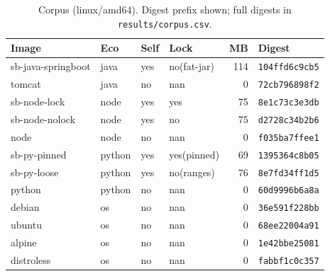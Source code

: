 \begin{table}[t]\centering\caption{Corpus (linux/amd64). Digest prefix shown; full digests in \texttt{results/corpus.csv}.}\label{tab:corpus}
\scriptsize\begin{tabular}{llllrl}\toprule
Image & Eco & Self & Lock & MB & Digest \\\midrule
sb-java-springboot & java & yes & no(fat-jar) & 114 & \texttt{104ffd6c9cb5} \\
tomcat & java & no & nan & 0 & \texttt{72cb796898f2} \\
sb-node-lock & node & yes & yes & 75 & \texttt{8e1c73c3e3db} \\
sb-node-nolock & node & yes & no & 75 & \texttt{d2728c34b2b6} \\
node & node & no & nan & 0 & \texttt{f035ba7ffee1} \\
sb-py-pinned & python & yes & yes(pinned) & 69 & \texttt{1395364c8b05} \\
sb-py-loose & python & yes & no(ranges) & 76 & \texttt{8e7fd34ff1d5} \\
python & python & no & nan & 0 & \texttt{60d9996b6a8a} \\
debian & os & no & nan & 0 & \texttt{36e591f228bb} \\
ubuntu & os & no & nan & 0 & \texttt{68ee22004a91} \\
alpine & os & no & nan & 0 & \texttt{1e42bbe25081} \\
distroless & os & no & nan & 0 & \texttt{fabbf1c0c357} \\
\bottomrule\end{tabular}\end{table}
